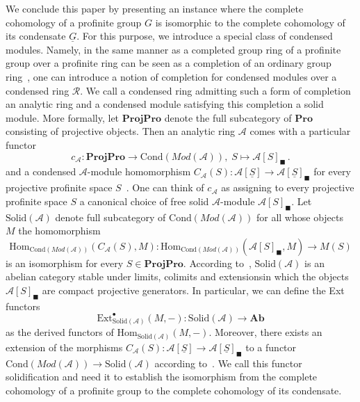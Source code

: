 \documentclass[12pt,a4paper]{article}
\numberwithin{equation}{section}
\theoremstyle{nonumberplain}
\begin{document}
We conclude this paper by presenting an instance where the complete cohomology of a profinite group $G$ is isomorphic to the complete cohomology of its condensate $\underline{G}$. For this purpose, we introduce a special class of condensed modules. Namely, in the same manner as a completed group ring of a profinite group over a profinite ring can be seen as a completion of an ordinary group ring~\cite[Proposition~7.1.2]{wil98}, one can introduce a notion of completion for condensed modules over a condensed ring $\mathcal{R}$. We call a condensed ring admitting such a form of completion an analytic ring and a condensed module satisfying this completion a solid module. More formally, let $\mathbf{ProjPro}$ denote the full subcategory of $\mathbf{Pro}$ consisting of projective objects. Then an analytic ring $\mathcal{A}$ comes with a particular functor
\[ c_{\mathcal{A}}: \mathbf{ProjPro} \rightarrow \mathrm{Cond}(Mod(\mathcal{A})), \; S \mapsto \mathcal{A}[S]_{\blacksquare}  \, . \]
and a condensed $\mathcal{A}$-module homomorphism $C_{\mathcal{A}}(S): \mathcal{A}[\underline{S}] \rightarrow \mathcal{A}[\underline{S}]_{\blacksquare}$ for every projective profinite space $S$~\cite[p.~44]{sch19}. One can think of $c_{\mathcal{A}}$ as assigning to every projective profinite space $S$ a canonical choice of free solid $\mathcal{A}$-module $\mathcal{A}[S]_{\blacksquare}$. Let $\mathrm{Solid}(\mathcal{A})$ denote full subcategory of $\mathrm{Cond}(Mod(\mathcal{A}))$ for all whose objects $M$ the homomorphism
\[ \mathrm{Hom}_{\mathrm{Cond}(Mod(\mathcal{A}))}(C_{\mathcal{A}}(S), M): \mathrm{Hom}_{\mathrm{Cond}(Mod(\mathcal{A}))}(\mathcal{A}[S]_{\blacksquare}, M) \rightarrow M(S) \]
is an isomorphism for every $S \in \mathbf{ProjPro}$. According to~\cite[Proposition~7.5]{sch19}, $\mathrm{Solid}(\mathcal{A})$ is an abelian category stable under limits, colimits and extensionsin which the objects $\mathcal{A}[S]_{\blacksquare}$ are compact projective generators. In particular, we can define the Ext functors
\[ \mathrm{Ext}_{\mathrm{Solid}(\mathcal{A})}^{\bullet}(M, -): \mathrm{Solid}(\mathcal{A}) \rightarrow \mathbf{Ab} \]
as the derived functors of $\mathrm{Hom}_{\mathrm{Solid}(\mathcal{A})}(M, -)$. Moreover, there exists an extension of the morphisms $C_{\mathcal{A}}(S): \mathcal{A}[\underline{S}] \rightarrow \mathcal{A}[\underline{S}]_{\blacksquare}$ to a functor $\mathrm{Cond}(Mod(\mathcal{A})) \rightarrow \mathrm{Solid}(\mathcal{A})$ according to~\cite[Proposition~7.5]{sch19}. We call this functor solidification and need it to establish the isomorphism from the complete cohomology of a profinite group to the complete cohomology of its condensate.
\end{document}
